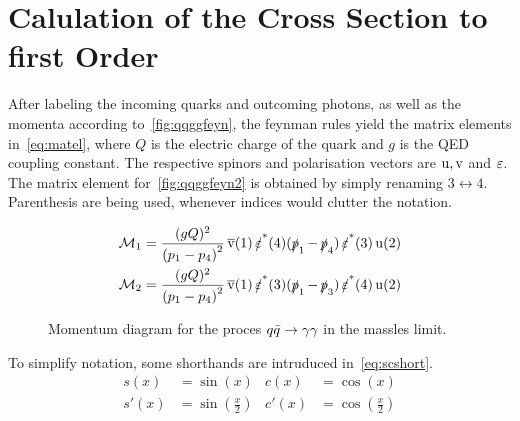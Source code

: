 
\section{Calulation of the Cross Section to first Order}%
\label{sec:qqggcalc}

After labeling the incoming quarks and outcoming photons, as well as
the momenta according to~\ref{fig:qqggfeyn}, the feynman rules yield
the matrix elements in~\eqref{eq:matel}, where \(Q\) is the electric
charge of the quark and \(g\) is the QED coupling constant. The
respective spinors and polarisation vectors are \(\operatorname{u},\operatorname{v}\) and
\(\operatorname{\varepsilon}\).  The matrix element for~\ref{fig:qqggfeyn2} is obtained by
simply renaming \(3\leftrightarrow 4\). Parenthesis are being used,
whenever indices would clutter the notation.

\begin{align}
  \label{eq:matel}
  \mathcal{M}_1 &= \frac{(gQ)^2}{\qty(p_1 - p_4)^2}\vsb(1)\pses(4)(\ps_1 -
                \ps_4)\pses(3)\us(2)\\
  \mathcal{M}_2 &= \frac{(gQ)^2}{\qty(p_1 - p_4)^2}\vsb(1)\pses(3)(\ps_1 - \ps_3)\pses(4)\us(2)
\end{align}

\begin{wrapfigure}{R}{0.4\textwidth}
\centering
{}
\caption{\label{fig:qqimpulses} Momentum diagram for the proces
  \(q\bar{q}\rightarrow\gamma\gamma\) in the massles limit.}
\end{wrapfigure}


To simplify notation, some shorthands are intruduced
in~\eqref{eq:scshort}.
\begin{equation}
  \label{eq:scshort}
  \begin{split}
    s(x) &= \sin(x) & c(x) &= \cos(x) \\ s'(x) &= \sin(\frac{x}{2}) & c'(x) &= \cos(\frac{x}{2})
  \end{split}
\end{equation}

